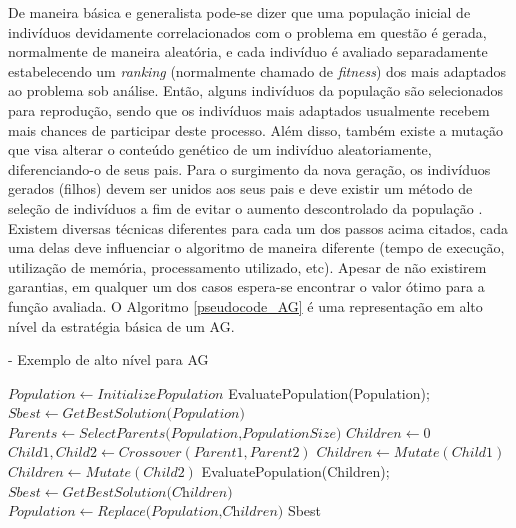 De maneira básica e generalista pode-se dizer que uma população inicial de indivíduos devidamente correlacionados com o problema em questão é gerada, normalmente de maneira aleatória, e cada indivíduo é avaliado separadamente estabelecendo um \emph{ranking} (normalmente chamado de \emph{fitness}) dos mais adaptados ao problema sob análise. Então, alguns indivíduos da população são selecionados para reprodução, sendo que os indivíduos mais adaptados usualmente recebem mais chances de participar deste processo. Além disso, também existe a mutação que visa alterar o conteúdo genético de um indivíduo aleatoriamente, diferenciando-o de seus pais. Para o surgimento da nova geração, os indivíduos gerados (filhos) devem ser unidos aos seus pais e deve existir um método de seleção de indivíduos a fim de evitar o aumento descontrolado da população \cite{Book-Back2000}. Existem diversas técnicas diferentes para cada um dos passos acima citados, cada uma delas deve influenciar o algoritmo de maneira diferente (tempo de execução, utilização de memória, processamento utilizado, etc). Apesar de não existirem garantias, em qualquer um dos casos espera-se encontrar o valor ótimo para a função avaliada. O Algoritmo \ref{pseudocode_AG} é uma representação em alto nível da estratégia básica de um AG. 

\begin{algorithm} [h]
\caption{ - Exemplo de alto nível para AG}
\begin{algorithmic}[1]
\State $Population\gets \textit{InitializePopulation}$
\State EvaluatePopulation(Population);
\State $Sbest\gets \textit{GetBestSolution(Population)}$
\State $Parents\gets \textit{SelectParents(Population,PopulationSize)}$
\State $Children\gets 0$
\State $Child1, Child2 \gets Crossover(Parent1, Parent2)$
\State $Children \gets Mutate(Child1)$
\State $Children \gets Mutate(Child2)$
\EndFor
\State EvaluatePopulation(Children);
\State $Sbest\gets \textit{GetBestSolution(Children)}$
\State $Population\gets \textit{Replace(Population,Children)}$
\EndWhile
\State\Return Sbest
\end{algorithmic}
\label{pseudocode_AG}
\end{algorithm}
